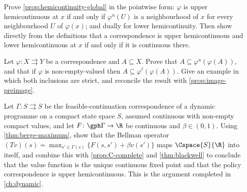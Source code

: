 \begin{exercise}\label{ex:corr-1}
	Prove \autoref{prop:hemicontinuity-global} in the pointwise form: $\varphi$ is
	upper hemicontinuous at $x$ if and only if $\varphi^{u}(U)$ is a neighbourhood
	of $x$ for every neighbourhood $U$ of $\varphi(x)$; and dually for lower
	hemicontinuity. Then show directly from the definitions that a correspondence
	is upper hemicontinuous and lower hemicontinuous at $x$ if and only if it is
	continuous there.
\end{exercise}

\begin{exercise}\label{ex:corr-2}
	Let $\varphi\colon X\rightrightarrows Y$ be a correspondence and $A\subseteq X$.
	Prove that $A\subseteq\varphi^{u}(\varphi(A))$, and that if $\varphi$ is
	non-empty-valued then $A\subseteq\varphi^{\ell}(\varphi(A))$. Give an example in
	which both inclusions are strict, and reconcile the result with
	\autoref{prop:image-preimage}.
\end{exercise}

\begin{exercise}\label{ex:corr-3}
	Let $\Gamma\colon S\rightrightarrows S$ be the feasible-continuation
	correspondence of a dynamic programme on a compact state space $S$, assumed
	continuous with non-empty compact values, and let
	$F\colon\gph\Gamma\to\R$ be continuous and $\beta\in(0,1)$. Using
	\autoref{thm:berge-maximum}, show that the Bellman operator
	$(Tv)(s)=\max_{s'\in\Gamma(s)}\{F(s,s')+\beta v(s')\}$ maps
	$\Cspace{S}{\R}$ into itself, and combine this with
	\autoref{prop:C-complete} and \autoref{thm:blackwell} to conclude that the value
	function is the unique continuous fixed point and that the policy
	correspondence is upper hemicontinuous. This is the argument completed in
	\autoref{ch:dynamic}.
\end{exercise}
